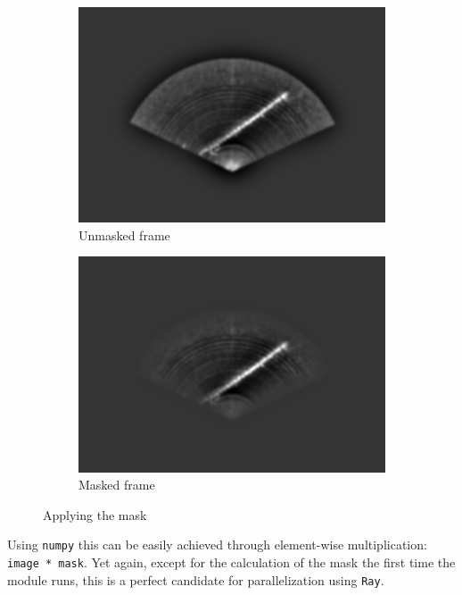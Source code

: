 \begin{figure}[H]
    \centering
    \begin{subfigure}[b]{.45\textwidth}
        \centering
        \includegraphics[width=\textwidth]{figures/pipeline/Bandpass.png}
        \caption{Unmasked frame}
    \end{subfigure}
    \hfill
    \begin{subfigure}[b]{.45\textwidth}
        \centering
        \includegraphics[width=\textwidth]{figures/pipeline/Masking.png}
        \caption{Masked frame}
    \end{subfigure}
    \caption{Applying the mask}
    \label{fig:mask-smoothing}
\end{figure}

Using \texttt{numpy} this can be easily achieved through element-wise multiplication: \lstinline{image * mask}. Yet again, except for the calculation of the mask the first time the module runs, this is a perfect candidate for parallelization using \texttt{Ray}.

